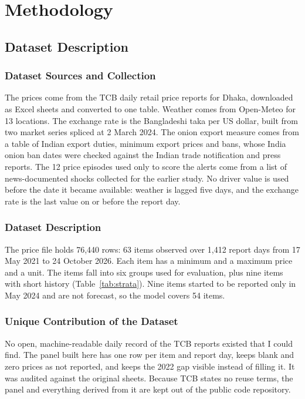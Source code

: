 \chapter{Methodology}

\section{Dataset Description}

\subsection{Dataset Sources and Collection}
The prices come from the TCB daily retail price reports for Dhaka, downloaded as Excel sheets and converted to one table. Weather comes from Open-Meteo for 13 locations. The exchange rate is the Bangladeshi taka per US dollar, built from two market series spliced at 2 March 2024. The onion export measure comes from a table of Indian export duties, minimum export prices and bans, whose India onion ban dates were checked against the Indian trade notification and press reports. The 12 price episodes used only to score the alerts come from a list of news-documented shocks collected for the earlier study. No driver value is used before the date it became available: weather is lagged five days, and the exchange rate is the last value on or before the report day.

\subsection{Dataset Description}
The price file holds 76,440 rows: 63 items observed over 1,412 report days from 17 May 2021 to 24 October 2026. Each item has a minimum and a maximum price and a unit. The items fall into six groups used for evaluation, plus nine items with short history (Table~\ref{tab:strata}). Nine items started to be reported only in May 2024 and are not forecast, so the model covers 54 items.

\begin{table}[H]\centering\small
\caption[Items by evaluation group]{Items by evaluation group.}\label{tab:strata}

\par{}
\end{table}

\subsection{Unique Contribution of the Dataset}
No open, machine-readable daily record of the TCB reports existed that I could find. The panel built here has one row per item and report day, keeps blank and zero prices as not reported, and keeps the 2022 gap visible instead of filling it. It was audited against the original sheets. Because TCB states no reuse terms, the panel and everything derived from it are kept out of the public code repository.

